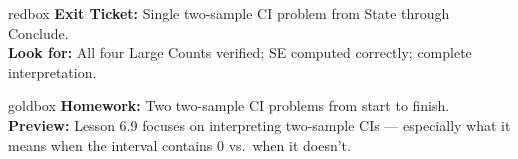 \documentclass[10pt]{article}
\begin{document}
\begin{skillbox}{redbox}
    \textbf{Exit Ticket:} Single two-sample CI problem from State through Conclude.\\[4pt]
    \textbf{Look for:} All four Large Counts verified; SE computed correctly; complete interpretation.
\end{skillbox}

\begin{skillbox}{goldbox}
    \textbf{Homework:} Two two-sample CI problems from start to finish.\\[4pt]
    \textbf{Preview:} Lesson 6.9 focuses on interpreting two-sample CIs --- especially what it
    means when the interval contains 0 vs.\ when it doesn't.
\end{skillbox}
\end{document}
